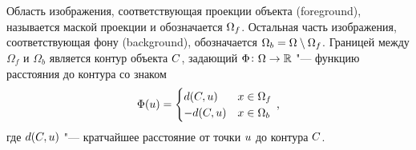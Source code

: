 Область изображения, соответствующая проекции объекта (foreground), называется
маской проекции и обозначается $\Omega_f$.
Остальная часть изображения, соответствующая фону (background), обозначается
$\Omega_b = \Omega \setminus \Omega_f$.
Границей между $\Omega_f$ и $\Omega_b$ является контур объекта $C$,
задающий
$\Phi \colon \Omega \to \mathbb{R}$ "---
функцию расстояния до контура со знаком
\begin{equation*}
    \Phi(\mathnormal{u}) =
    \begin{cases}
        d(C, \mathnormal{u})  & x \in \Omega_f \\
        -d(C, \mathnormal{u})  & x \in \Omega_b
    \end{cases}
    \,\text{,}
\end{equation*}
где $d(C, \mathnormal{u})$ "--- кратчайшее расстояние от точки $\mathnormal{u}$
до контура $C$.

